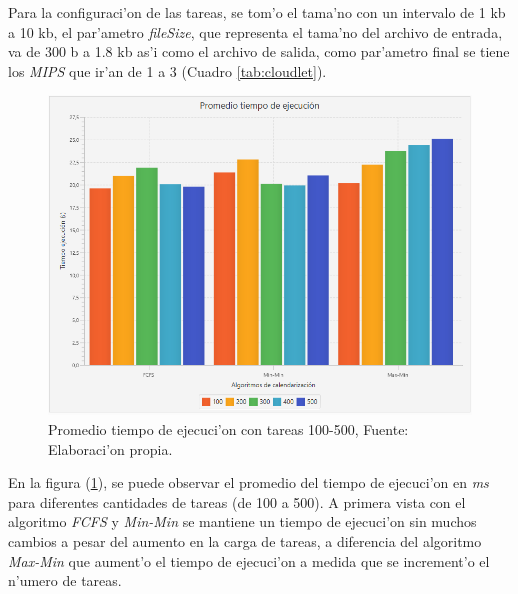 Para la configuraci'on de las tareas, se tom'o el tama'no con un intervalo de 1 kb a 10 kb,  el par'ametro \textit{fileSize}, que representa el tama'no del archivo de entrada, va de 300 b a 1.8 kb as'i como el archivo de salida, como par'ametro final se tiene los \textit{MIPS} que ir'an de 1 a 3 (Cuadro \ref{tab:cloudlet}).



\newpage
\setcounter{figure}{14}
\renewcommand\thefigure{\arabic{figure}}
\begin{figure}[h!] 
	\centering
	\includegraphics[scale=0.5]{media/tiempoejecucion}
	\caption{Promedio tiempo de ejecuci'on con tareas 100-500, Fuente: Elaboraci'on propia.}
	\label{fig:tiempo}
\end{figure}



En la figura (\ref{fig:tiempo}), se puede observar el promedio del tiempo de ejecuci'on en \emph{ms} para diferentes cantidades de tareas (de 100 a 500). A primera vista con el algoritmo \textit{FCFS} y \textit{Min-Min} se mantiene un tiempo de ejecuci'on sin muchos cambios a pesar del aumento en la carga de tareas, a diferencia del algoritmo \textit{Max-Min} que aument'o el tiempo de ejecuci'on a medida que se increment'o el n'umero de tareas.


